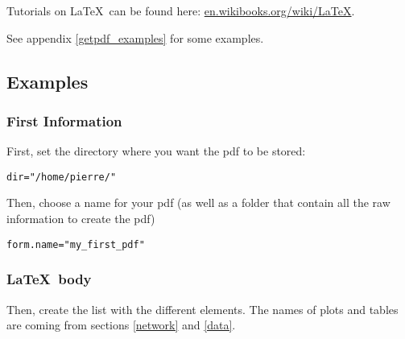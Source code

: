 \documentclass{article}\usepackage[]{graphicx}\usepackage[]{color}
\makeatletter
\newcommand{\hlstr}[1]{\textcolor[rgb]{0.192,0.494,0.8}{#1}}%
\newcommand{\hlstd}[1]{\textcolor[rgb]{0.345,0.345,0.345}{#1}}%
\newcommand{\hlkwb}[1]{\textcolor[rgb]{0.69,0.353,0.396}{#1}}%
\newenvironment{kframe}{%
 \def\at@end@of@kframe{}%
 \ifinner\ifhmode%
  \def\at@end@of@kframe{\end{minipage}}%
  \begin{minipage}{\columnwidth}%
 \fi\fi%
 \def\FrameCommand##1{\hskip\@totalleftmargin \hskip-\fboxsep
 \colorbox{shadecolor}{##1}\hskip-\fboxsep
     \hskip-\linewidth \hskip-\@totalleftmargin \hskip\columnwidth}%
 \MakeFramed {\advance\hsize-\width
   \@totalleftmargin\z@ \linewidth\hsize
   \@setminipage}}%
 {\par\unskip\endMakeFramed%
 \at@end@of@kframe}
\newenvironment{knitrout}{}{} %
\makeatother
\begin{document}
Tutorials on \LaTeX~can be found here: \url{en.wikibooks.org/wiki/LaTeX}.

See appendix \ref{getpdf_examples} for some examples.

\subsection{Examples}

\subsubsection{First Information}
First, set the directory where you want the pdf to be stored:
\begin{knitrout}
\color{fgcolor}\begin{kframe}
\begin{alltt}
\hlstd{dir} \hlkwb{=} \hlstr{"/home/pierre/"}
\end{alltt}
\end{kframe}
\end{knitrout}

Then, choose a name for your pdf (as well as a folder that contain all the raw information to create the pdf) 
\begin{knitrout}
\color{fgcolor}\begin{kframe}
\begin{alltt}
\hlstd{form.name} \hlkwb{=} \hlstr{"my_first_pdf"}
\end{alltt}
\end{kframe}
\end{knitrout}

\subsubsection{\LaTeX~body}

Then, create the list with the different elements.
The names of plots and tables are coming from sections \ref{network} and \ref{data}.
\end{document}
